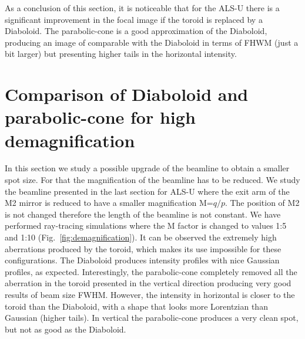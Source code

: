\documentclass{iucr}              %
\begin{document}
As a conclusion of this section, it is noticeable that for the ALS-U there is a significant improvement in the focal image if the toroid is replaced by a Diaboloid. The parabolic-cone is a good approximation of the Diaboloid, producing an image of comparable with the Diaboloid in terms of FHWM (just a bit larger) but presenting higher tails in the horizontal intensity. 

\section{Comparison of Diaboloid and parabolic-cone for high demagnification}
\label{sec:scan}

In this section we study a possible upgrade of the beamline to obtain a smaller spot size. For that the magnification of the beamline has to be reduced. We study the beamline presented in the last section for ALS-U where the exit arm of the M2 mirror is reduced to have a smaller magnification M=$q/p$. The position of M2 is not changed therefore the length of the beamline is not constant. We have performed ray-tracing simulations where the M factor is changed to values 1:5 and 1:10 (Fig.~\ref{fig:demagnification}). It can be observed the extremely high aberrations produced by the toroid, which makes its use impossible for these configurations. The Diaboloid produces intensity profiles with nice Gaussian profiles, as expected. Interestingly, the parabolic-cone completely removed all the aberration in the toroid presented in the vertical direction producing very good results of beam size FWHM. However, the intensity in horizontal is closer to the toroid than the Diaboloid, with a shape that looks more Lorentzian than Gaussian (higher tails). In vertical the parabolic-cone produces a very clean spot, but not as good as the Diaboloid. 
\end{document}
